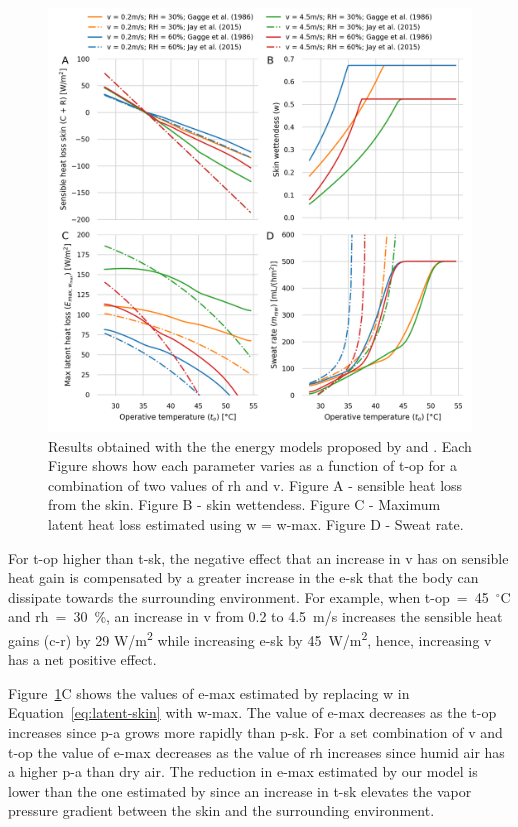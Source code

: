 \begin{figure}[thb!]
    \centering
    \includegraphics[width=\textwidth]{figures/comparison_models_v2.png}
    \caption{Results obtained with the the energy models proposed by  and .
    Each Figure shows how each parameter varies as a function of \ac{t-op} for a combination of two values of \ac{rh} and \ac{v}.
    Figure A - sensible heat loss from the skin.
    Figure B - skin wettendess.
    Figure C - Maximum latent heat loss estimated using \ac{w} = \ac{w-max}.
    Figure D - Sweat rate.}
    \label{fig:comparison_models}
\end{figure}

For \ac{t-op} higher than \ac{t-sk}, the negative effect that an increase in \ac{v} has on sensible heat gain is compensated by a greater increase in the \acf{e-sk} that the body can dissipate towards the surrounding environment.
For example, when \ac{t-op}~=~45~$^{\circ}$C and \ac{rh}~=~30~\%, an increase in \ac{v} from 0.2 to 4.5~m/s increases the sensible heat gains (\acs{c-r}) by 29 W/m\textsuperscript{2} while increasing \ac{e-sk} by 45~W/m\textsuperscript{2}, hence, increasing \ac{v} has a net positive effect.

Figure~\ref{fig:comparison_models}C shows the values of \ac{e-max} estimated by replacing \ac{w} in Equation~\ref{eq:latent-skin} with \ac{w-max}.
The value of \ac{e-max} decreases as the \ac{t-op} increases since \ac{p-a} grows more rapidly than \ac{p-sk}.
For a set combination of \ac{v} and \ac{t-op} the value of \ac{e-max} decreases as the value of \ac{rh} increases since humid air has a higher \ac{p-a} than dry air.
The reduction in \ac{e-max} estimated by our model is lower than the one estimated by  since an increase in \ac{t-sk} elevates the vapor pressure gradient between the skin and the surrounding environment.

